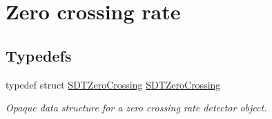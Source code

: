 \hypertarget{group__zerocrossing}{}\section{Zero crossing rate}
\label{group__zerocrossing}
\subsection*{Typedefs}
\begin{DoxyCompactItemize}
\item 
\hypertarget{group__zerocrossing_gae3cf5e0effced03712240753a4a60d06}{}typedef struct \hyperlink{group__zerocrossing_gae3cf5e0effced03712240753a4a60d06}{S\+D\+T\+Zero\+Crossing} \hyperlink{group__zerocrossing_gae3cf5e0effced03712240753a4a60d06}{S\+D\+T\+Zero\+Crossing}\label{group__zerocrossing_gae3cf5e0effced03712240753a4a60d06}

\begin{DoxyCompactList}\small\item\em Opaque data structure for a zero crossing rate detector object. \end{DoxyCompactList}\end{DoxyCompactItemize}
